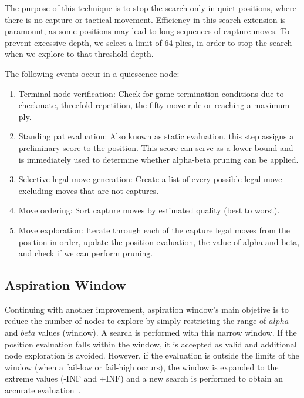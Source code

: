 \noindent The purpose of this technique is to stop the search only in quiet positions, where there is no capture or tactical movement. Efficiency in this search extension is paramount, as some positions may lead to long sequences of capture moves. To prevent excessive depth, we select a limit of 64 plies, in order to stop the search when we explore to that threshold depth.

\vspace{1em}

\noindent The following events occur in a quiescence node:

\begin{enumerate}
    \item Terminal node verification: Check for game termination conditions due to checkmate, threefold repetition, the fifty-move rule or reaching a maximum ply.
    \item Standing pat evaluation: Also known as static evaluation, this step assigns a preliminary score to the position. This score can serve as a lower bound and is immediately used to determine whether alpha-beta pruning can be applied.
    \item Selective legal move generation: Create a list of every possible legal move excluding moves that are not captures.
    \item Move ordering: Sort capture moves by estimated quality (best to worst).
    \item Move exploration: Iterate through each of the capture legal moves from the position in order, update the position evaluation, the value of alpha and beta, and check if we can perform pruning.
\end{enumerate}

\subsection*{Aspiration Window}

Continuing with another improvement, aspiration window's main objetive is to reduce the number of nodes to explore by simply restricting the range of $alpha$ and $beta$ values (window). A search is performed with this narrow window. If the position evaluation falls within the window, it is accepted as valid and additional node exploration is avoided. However, if the evaluation is outside the limits of the window (when a fail-low or fail-high occurs), the window is expanded to the extreme values (-INF and +INF) and a new search is performed to obtain an accurate evaluation~\cite{AspirationWindow}.

